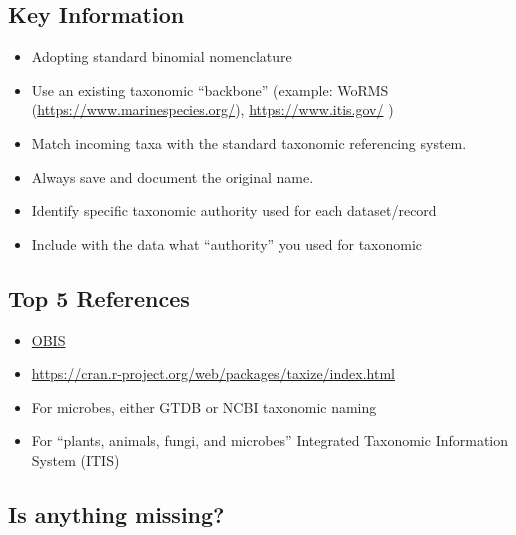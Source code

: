 \documentclass[
  oneside]{book}
\providecommand{\tightlist}{%
  \setlength{\itemsep}{0pt}\setlength{\parskip}{0pt}}
\begin{document}
\hypertarget{key-information-3}{%
\subsection{Key Information}\label{key-information-3}}

\begin{itemize}
\tightlist
\item
  Adopting standard binomial nomenclature
\item
  Use an existing taxonomic ``backbone'' (example: WoRMS (\url{https://www.marinespecies.org/}), \url{https://www.itis.gov/} )
\item
  Match incoming taxa with the standard taxonomic referencing system.
\item
  Always save and document the original name.
\item
  Identify specific taxonomic authority used for each dataset/record
\item
  Include with the data what ``authority'' you used for taxonomic
\end{itemize}

\hypertarget{top-5-references-3}{%
\subsection{Top 5 References}\label{top-5-references-3}}

\begin{itemize}
\tightlist
\item
  \href{https://obis.org/}{OBIS}
\item
  \url{https://cran.r-project.org/web/packages/taxize/index.html}
\item
  For microbes, either GTDB or NCBI taxonomic naming
\item
  For ``plants, animals, fungi, and microbes'' Integrated Taxonomic Information System (ITIS)
\end{itemize}

\hypertarget{is-anything-missing-3}{%
\subsection{Is anything missing?}\label{is-anything-missing-3}}
\end{document}
